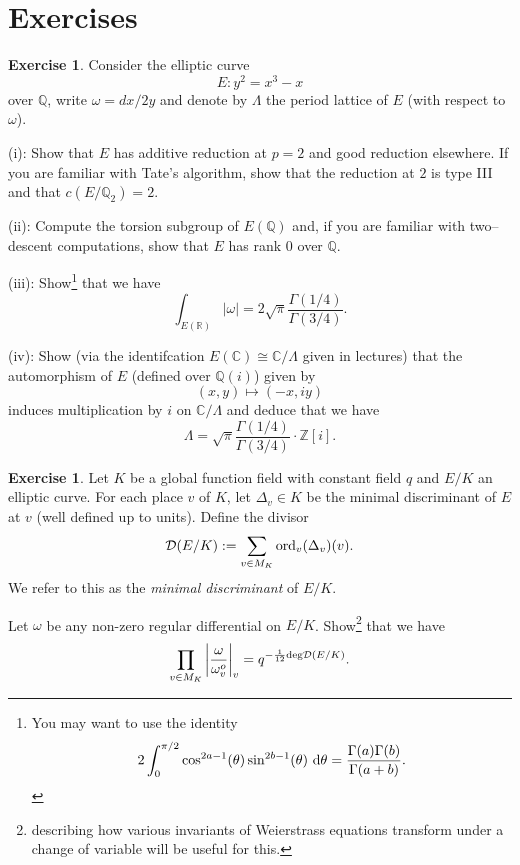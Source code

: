 \documentclass[12pt]{amsart}
\numberwithin{equation}{section}
\theoremstyle{remark}
\theoremstyle{definition}
\theoremstyle{definition}
\theoremstyle{definition}
\theoremstyle{definition}
\theoremstyle{definition}
\theoremstyle{definition}
\newtheorem{exercise}[equation]{Exercise}
\theoremstyle{definition}
\begin{document}
\newpage

\section{Exercises}

\begin{exercise}
Consider the elliptic curve \[E:y^2=x^3-x\] over $\mathbb{Q}$, write $\omega=dx/2y$ and denote by $\Lambda$ the period lattice of $E$ (with respect to $\omega$). 

(i): Show that $E$ has additive reduction at $p=2$ and good reduction elsewhere. If you are familiar with Tate's algorithm, show that the reduction at $2$ is  type III  and that $c(E/\mathbb{Q}_2)=2$.

 (ii): Compute the torsion subgroup of $E(\mathbb{Q})$ and, if you are familiar with two--descent computations, show that $E$ has rank $0$ over $\mathbb{Q}$. 

(iii): Show\footnote{You may want to use the identity \[2\int_{0}^{\pi/2}\cos^{2a-1}(\theta)\sin^{2b-1}(\theta)~\textup{d}\theta=\frac{\Gamma(a)\Gamma(b)}{\Gamma(a+b)}.\]} that we have
\[\int_{E(\mathbb{R})}|\omega|=2\sqrt{\pi}\frac{\Gamma(1/4)}{\Gamma(3/4)}.\]

(iv): Show (via the identifcation $E(\mathbb{C})\cong \mathbb{C}/\Lambda$ given in lectures) that  the automorphism of $E$ (defined over $\mathbb{Q}(i)$) given by
\[(x,y)\mapsto (-x,iy)\]
induces multiplication by $i$ on $\mathbb{C}/\Lambda$ and deduce that we have
\[\Lambda=\sqrt{\pi}\frac{\Gamma(1/4)}{\Gamma(3/4)}\cdot \mathbb{Z}[i].\]
\end{exercise}

%

\begin{exercise} 
 Let $K$ be a global function field with constant field $q$ and $E/K$ an elliptic curve. For each place $v$ of $K$, let $\Delta_v\in K$ be the minimal discriminant of $E$ at $v$ (well defined up to units). Define the divisor
 \[\mathcal{D}(E/K):=\sum_{v\in M_K}\textup{ord}_v(\Delta_v)(v).\]
 We refer to this as the \textit{minimal discriminant} of $E/K$. 
 
Let $\omega$ be any non-zero regular differential on $E/K$. Show\footnote{\cite[Table 3.1]{MR2514094} describing how various invariants of Weierstrass equations transform under a change of variable will be useful for this.} that we have
\[\prod_{v\in M_K}\left|\frac{\omega}{\omega_{v}^o}\right|_v=q^{-\frac{1}{12}\textup{deg}\mathcal{D}(E/K)}.\] 
 \end{exercise}
 
\end{document}
